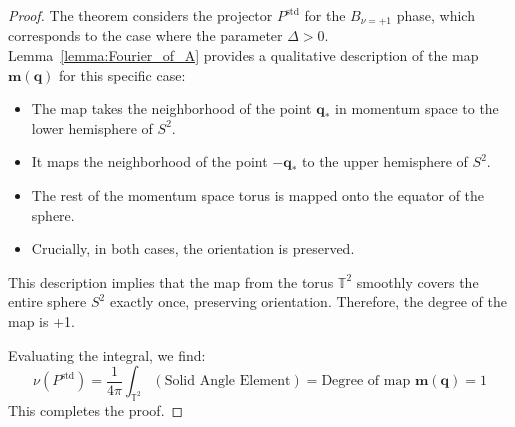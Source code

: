 \begin{proof}
The theorem considers the projector $P^{\text{std}}$ for the $B_{\nu=+1}$ phase, which corresponds to the case where the parameter $\Delta > 0$. Lemma~\ref{lemma:Fourier_of_A} provides a qualitative description of the map $\mathbf{m}(\mathbf{q})$ for this specific case:
\begin{itemize}
\item The map takes the neighborhood of the point $\mathbf{q}_*$ in momentum space to the lower hemisphere of $S^2$.
 \item It maps the neighborhood of the point $-\mathbf{q}_*$ to the upper hemisphere of $S^2$.
\item The rest of the momentum space torus is mapped onto the equator of the sphere.
\item Crucially, in both cases, the orientation is preserved.
\end{itemize}
This description implies that the map from the torus $\mathbb{T}^2$ smoothly covers the entire sphere $S^2$ exactly once, preserving orientation. Therefore, the degree of the map is +1.

Evaluating the integral, we find:
$$ \nu(P^{\text{std}}) = \frac{1}{4\pi} \int_{\mathbb{T}^2} (\text{Solid Angle Element}) = \text{Degree of map } \mathbf{m}(\mathbf{q}) = 1 $$
This completes the proof.
\end{proof}
